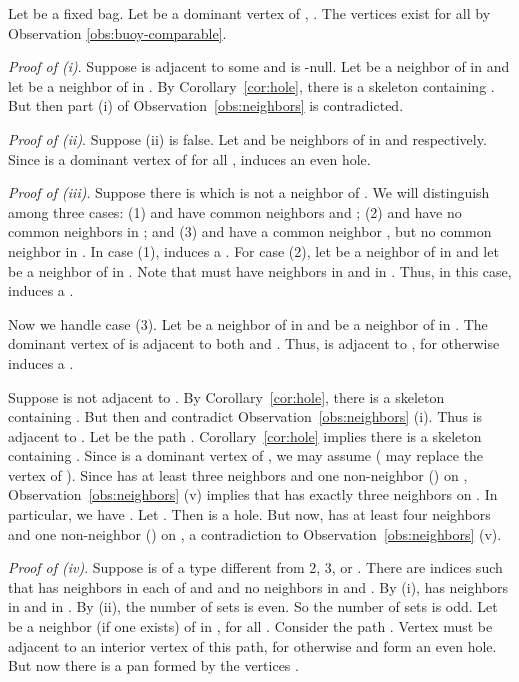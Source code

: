\documentclass[11pt,a4paper]{article}
\def\qed{\hfill \vspace{2ex}}
\newenvironment{proof}{\noindent {\it Proof:~}}{\hfill \smallskip\par}
\begin{document}
\begin{proof}
Let  be a fixed bag. Let  be a dominant vertex of ,
. The vertices  exist for all  by
Observation \ref{obs:buoy-comparable}.

\textit{Proof of (i)}. Suppose  is adjacent to some  and is -null. Let 
be a neighbor of  in  and let 
be a neighbor of  in . By Corollary~\ref{cor:hole}, there is a
skeleton  containing . But then part (i)
of Observation~\ref{obs:neighbors} is contradicted.  \qed

\textit{Proof of (ii)}. Suppose (ii) is false. Let  and  be
neighbors of  in  and  respectively. Since  is
a dominant vertex of  for all ,
     induces an even hole.
\qed

\textit{Proof of (iii)}. Suppose there is  which is
not a neighbor of . We will distinguish among three cases: (1)
 and  have common neighbors  and
; (2)   and  have no common neighbors
in ; and (3)   and  have a common
neighbor , but no common neighbor in
. In case (1),  induces a
. For case (2), let  be a neighbor of  in
 and let  be a neighbor of  in .
Note that  must have neighbors  in   and
 in . Thus, in
this case, 
induces a .

Now we handle case (3). Let  be a neighbor of  in
 and  be a neighbor of  in . The
dominant vertex  of  is adjacent to both  and
. Thus,  is adjacent to , for otherwise  induces a .

Suppose  is not adjacent to . By
Corollary~\ref{cor:hole}, there is a skeleton  containing
. But then  and  contradict
Observation~\ref{obs:neighbors} (i). Thus  is  adjacent to
. Let  be the path .
Corollary~\ref{cor:hole} implies there is a skeleton 
containing . Since  is a dominant vertex of ,
we may assume  ( may replace the vertex of
). Since  has at least three neighbors and one
non-neighbor () on , Observation~\ref{obs:neighbors} (v)
implies that  has exactly three neighbors on . In
particular, we have . Let . Then  is a hole. But now, 
has at least four neighbors and one non-neighbor () on
, a contradiction to Observation~\ref{obs:neighbors} (v). \qed




\textit{Proof of (iv)}. Suppose  is of a type different from 2,
3, or . There are indices  such that  has neighbors
in each of  and  and no neighbors in  and  . By (i), 
has neighbors in  and in . By (ii), the number
of sets  is even. So the number of
sets  is odd. Let  be a
neighbor (if one exists) of  in , for all . Consider
the path . Vertex 
must be adjacent to an interior vertex  of this path, for
otherwise  and  form an even hole. But now there is a pan
formed by the vertices .


\end{proof}
\end{document}
